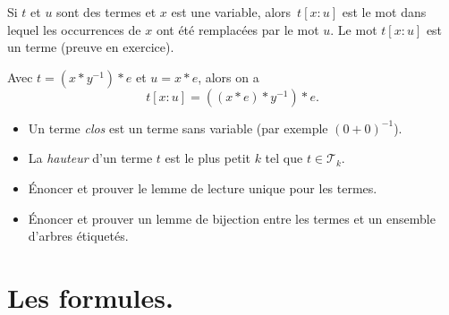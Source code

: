 \documentclass[./main]{subfiles}
\begin{document}
  \begin{defn}
    Si $t$ et $u$ sont des termes et $x$ est une variable, alors~$t[x:u]$ est le mot dans lequel les occurrences de $x$ ont été remplacées par le mot $u$.
    Le mot $t[x:u]$ est un terme (preuve en exercice).
  \end{defn}

  \begin{exm}
    Avec $t = (x * y^{-1}) * e$ et $u = x * e$, alors on a \[
      t[x:u] = ((x*e) * y^{-1}) * e
    .\]
  \end{exm}

  \begin{defn}
    \begin{itemize}
      \item Un terme \textit{clos} est un terme sans variable (par exemple $(0 + 0)^{-1}$).
      \item La \textit{hauteur} d'un terme $t$ est le plus petit $k$ tel que $t \in \mathcal{T}_k$.
    \end{itemize}
  \end{defn}

  \begin{exo}
    \begin{itemize}
      \item Énoncer et prouver le lemme de lecture unique pour les termes.
      \item Énoncer et prouver un lemme de bijection entre les termes et un ensemble d'arbres étiquetés.
    \end{itemize}
  \end{exo}

  \section{Les formules.}
\end{document}
